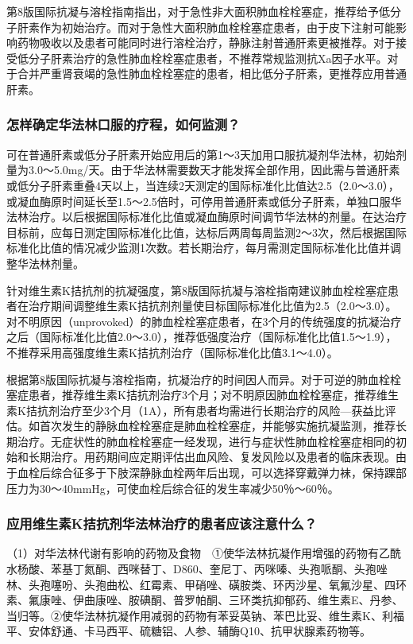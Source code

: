 第8版国际抗凝与溶栓指南指出，对于急性非大面积肺血栓栓塞症，推荐给予低分子肝素作为初始治疗。而对于急性大面积肺血栓栓塞症患者，由于皮下注射可能影响药物吸收以及患者可能同时进行溶栓治疗，静脉注射普通肝素更被推荐。对于接受低分子肝素治疗的急性肺血栓栓塞症患者，不推荐常规监测抗Xa因子水平。对于合并严重肾衰竭的急性肺血栓栓塞症的患者，相比低分子肝素，更推荐应用普通肝素。

\subsubsection{怎样确定华法林口服的疗程，如何监测？}

可在普通肝素或低分子肝素开始应用后的第1～3天加用口服抗凝剂华法林，初始剂量为3.0～5.0mg/天。由于华法林需要数天才能发挥全部作用，因此需与普通肝素或低分子肝素重叠4天以上，当连续2天测定的国际标准化比值达2.5（2.0～3.0），或凝血酶原时间延长至1.5～2.5倍时，可停用普通肝素或低分子肝素，单独口服华法林治疗。以后根据国际标准化比值或凝血酶原时间调节华法林的剂量。在达治疗目标前，应每日测定国际标准化比值，达标后两周每周监测2～3次，然后根据国际标准化比值的情况减少监测1次数。若长期治疗，每月需测定国际标准化比值并调整华法林剂量。

针对维生素K拮抗剂的抗凝强度，第8版国际抗凝与溶栓指南建议肺血栓栓塞症患者在治疗期间调整维生素K拮抗剂剂量使目标国际标准化比值为2.5（2.0～3.0）。对不明原因（unprovoked）的肺血栓栓塞症患者，在3个月的传统强度的抗凝治疗之后（国际标准化比值2.0～3.0），推荐低强度治疗（国际标准化比值1.5～1.9），不推荐采用高强度维生素K拮抗剂治疗（国际标准化比值3.1～4.0）。

根据第8版国际抗凝与溶栓指南，抗凝治疗的时间因人而异。对于可逆的肺血栓栓塞症患者，推荐维生素K拮抗剂治疗3个月；对不明原因肺血栓栓塞症，推荐维生素K拮抗剂治疗至少3个月（1A），所有患者均需进行长期治疗的风险---获益比评估。如首次发生的静脉血栓栓塞症是肺血栓栓塞症，并能够实施抗凝监测，推荐长期治疗。无症状性的肺血栓栓塞症一经发现，进行与症状性肺血栓栓塞症相同的初始和长期治疗。用药期间应定期评估出血风险、复发风险以及患者的临床表现。由于血栓后综合征多于下肢深静脉血栓两年后出现，可以选择穿戴弹力袜，保持踝部压力为30～40mmHg，可使血栓后综合征的发生率减少50％～60％。

\subsubsection{应用维生素K拮抗剂华法林治疗的患者应该注意什么？}

（1）对华法林代谢有影响的药物及食物　①使华法林抗凝作用增强的药物有乙酰水杨酸、苯基丁氮酮、西咪替丁、D860、奎尼丁、丙咪嗪、头孢哌酮、头孢唑林、头孢噻吩、头孢曲松、红霉素、甲硝唑、磺胺类、环丙沙星、氧氟沙星、四环素、氟康唑、伊曲康唑、胺碘酮、普罗帕酮、三环类抗抑郁药、维生素E、丹参、当归等。②使华法林抗凝作用减弱的药物有苯妥英钠、苯巴比妥、维生素K、利福平、安体舒通、卡马西平、硫糖铝、人参、辅酶Q10、抗甲状腺素药物等。

